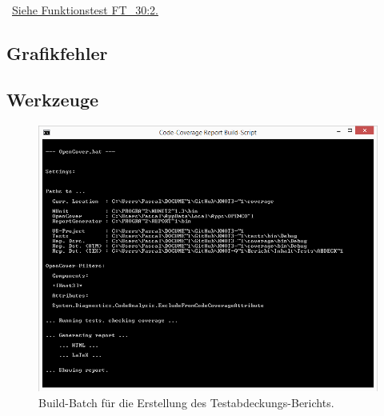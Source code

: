 		~\\\mousecursor~\hyperref[FT:30:Schlaufe]{Siehe Funktionstest FT\_30:2.} 
	
	
\clearpage	
% 



\newpage




\subsection*{Grafikfehler}



\newpage



\subsection*{Werkzeuge}



\begin{figure}[ht]

	\centering
	
	\includegraphics[width=\textwidth]{Inhalt/Anhang/Grafiken/Werkzeuge/Code-Coverage Report Build-Script.png}
	
	\caption{Build-Batch für die Erstellung des Testabdeckungs-Berichts.}

\end{figure}








